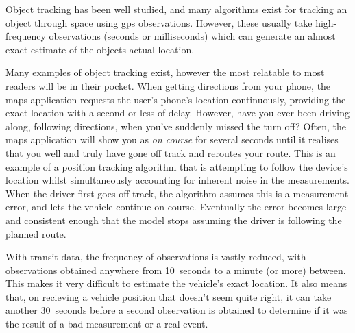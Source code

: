 Object tracking has been well studied, and many algorithms exist for tracking an object through space using \gls{gps} observations. However, these usually take high-frequency observations (seconds or milliseconds) which can generate an almost exact \rt{} estimate of the objects actual location.


Many examples of \rt{} object tracking exist, however the most relatable to most readers will be in their pocket. When getting directions from your phone, the maps application requests the user's phone's location continuously, providing the exact location with a second or less of delay. However, have you ever been driving along, following directions, when you've suddenly missed the turn off? Often, the maps application will show you as \emph{on course} for several seconds until it realises that you well and truly have gone off track and reroutes your route. This is an example of a \rt{} position tracking algorithm that is attempting to follow the device's location whilst simultaneously accounting for inherent noise in the measurements. When the driver first goes off track, the algorithm assumes this is a measurement error, and lets the vehicle continue on course. Eventually the error becomes large and consistent enough that the model stops assuming the driver is following the planned route.


With \rt{} transit data, the frequency of observations is vastly reduced, with observations obtained anywhere from 10~seconds to a minute (or more) between. This makes it very difficult to estimate the vehicle's exact location. It also means that, on recieving a vehicle position that doesn't seem quite right, it can take another 30~seconds before a second observation is obtained to determine if it was the result of a bad measurement or a real event.


